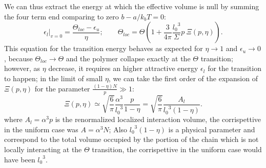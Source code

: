 \documentclass[12pt,a4paper,notitlepage]{article}
\begin{document}
We can thus extract the energy at which the effective volume is null
by summing the four term end comparing to zero $b - a/k_bT = 0$: 
\begin{equation}
\left. \epsilon_l \right|_{v = 0} = 
\frac{\Theta_{loc} - \epsilon_u}{\eta}; \qquad
\Theta_{loc} = \Theta \left( 1 + \frac{3}{4\pi} \frac{{l_0}^3}{\Sigma} p\
  \Xi(p, \eta) \right).
\label{eq:loccrituno}
\end{equation}
This equation for the transition energy behaves as expected
for $\eta \to 1$ and $\epsilon_u \to 0$, because $\Theta_{loc} \to
\Theta$ and the polymer collapse exactly at the $\Theta$ transition;
however, as $\eta$ decrease, 
it requires an higher attractive energy $\epsilon_l$ for the
transition to happen; in the limit of small $\eta$, we can take the
first order of the expansion of
$\Xi(p, \eta)$ for the parameter $\frac{(1 - \eta)N}{p} \gg 1$:
\begin{equation}
  \Xi(p, \eta) \simeq \sqrt{\frac{6}{\pi}} \frac{\alpha^3}{{l_0}^3}
  \frac{p}{1 - \eta} = \sqrt{\frac{6}{\pi}} \frac{A_l}{{l_0}^3(1 - \eta)}.
\end{equation}
where $A_l = \alpha^3 p$ is the renormalized localized interaction
volume, the corrispettive in the uniform case was $A = \alpha^3 N$;
Also ${l_0}^3(1 - \eta)$ is a physical parameter and correspond to the
total volume occupied by the portion of the chain which is not locally
interacting at the $\Theta$ transition, the corrispettive in the
uniform case would have been ${l_0}^3$.
\end{document}

